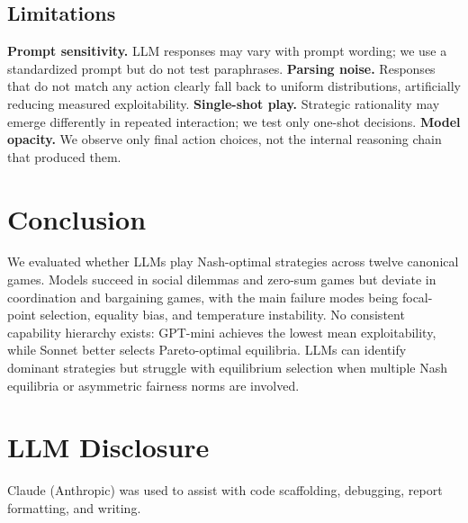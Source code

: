 \documentclass[10pt,twocolumn]{article}
\begin{document}
\subsection{Limitations}

\textbf{Prompt sensitivity.}
LLM responses may vary with prompt wording; we use a standardized prompt but
do not test paraphrases.
\textbf{Parsing noise.}
Responses that do not match any action clearly fall back to uniform
distributions, artificially reducing measured exploitability.
\textbf{Single-shot play.}
Strategic rationality may emerge differently in repeated interaction;
we test only one-shot decisions.
\textbf{Model opacity.}
We observe only final action choices, not the internal reasoning chain
that produced them.

\section{Conclusion}

We evaluated whether LLMs play Nash-optimal strategies across twelve canonical
games. Models succeed in social dilemmas and zero-sum games but deviate in
coordination and bargaining games, with the main failure modes being
focal-point selection, equality bias, and temperature instability. No consistent capability hierarchy exists: GPT-mini
achieves the lowest mean exploitability, while Sonnet better selects
Pareto-optimal equilibria. LLMs can identify dominant strategies but struggle
with equilibrium selection when multiple Nash equilibria or asymmetric fairness
norms are involved.

\section*{LLM Disclosure}
Claude (Anthropic) was used to assist with code scaffolding, debugging,
report formatting, and writing.
\end{document}
